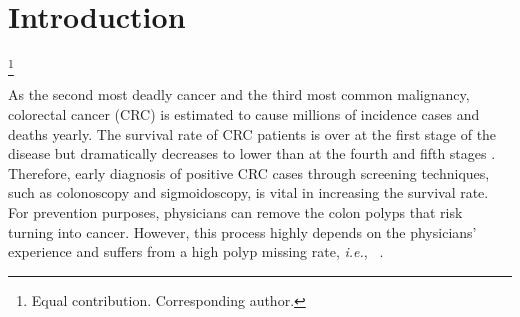 \documentclass[default,iicol]{sn-jnl}
\theoremstyle{thmstyleone}
\theoremstyle{thmstyletwo}
\theoremstyle{thmstylethree}
\def\ie{\emph{i.e.}}
\newcommand\blfootnote[1]{
    \begingroup
    \renewcommand\thefootnote{}\footnote{#1}
    \addtocounter{footnote}{-1}
    \endgroup
}
\begin{document}

\maketitle

\section{Introduction}
\blfootnote{ Equal contribution.  Corresponding author.}

As the second most deadly cancer and the third most common malignancy, colorectal cancer (CRC) is estimated to cause millions of incidence cases and deaths yearly.
The survival rate of CRC patients is over  at the first stage of the disease but dramatically decreases to lower than  at the fourth and fifth stages \cite{bernal2012towards}.
Therefore, early diagnosis of positive CRC cases through screening techniques, such as colonoscopy and sigmoidoscopy, is vital in increasing the survival rate.
For prevention purposes, physicians can remove the colon polyps that risk turning into cancer.
However, this process highly depends on the physicians' experience and suffers from a high polyp missing rate, \ie, ~\cite{puyal2020endoscopic}.
\end{document}
